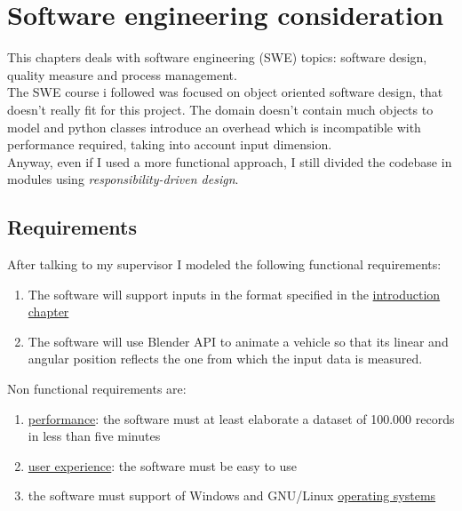 \chapter{Software engineering consideration}
\label{chap:software_engineering_consideration}

This chapters deals with software engineering (SWE) topics: software design, quality measure and process management. \\
The SWE course i followed was focused on object oriented software design, that doesn't really fit for this project. The domain doesn't contain much objects to model and python classes introduce an overhead which is incompatible with performance required, taking into account input dimension. \\
Anyway, even if I used a more functional approach, I still divided the codebase in modules using \textit{responsibility-driven design}.

\section{Requirements}
After talking to my supervisor I modeled the following functional requirements:
\begin{enumerate}
\item The software will support inputs in the format specified in the \hyperref[chap:intro]{introduction chapter}
\item The software will use Blender API to animate a vehicle so that its linear and angular position reflects the one from which the input data is measured.
\end{enumerate}
Non functional requirements are:
\begin{enumerate} 
\item \underline{performance}: the software must at least elaborate a dataset of 100.000 records in less than five minutes
\item \underline{user experience}: the software must be easy to use
\item the software must support of Windows and GNU/Linux \underline{operating systems}
\end{enumerate}

